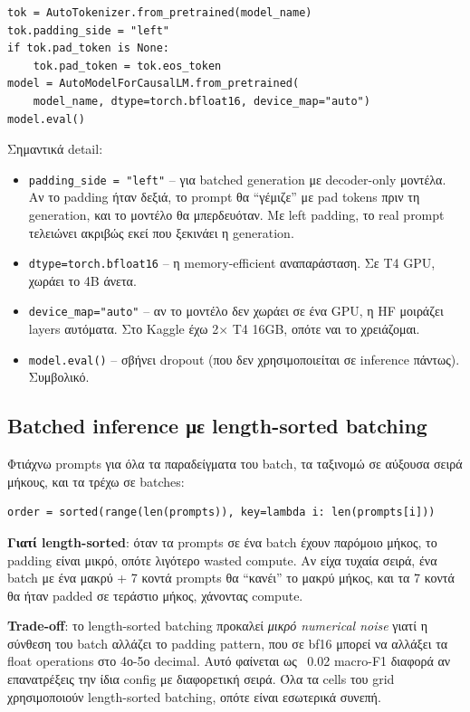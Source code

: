 \documentclass[12pt]{fphw}
\begin{document}
\begin{verbatim}
tok = AutoTokenizer.from_pretrained(model_name)
tok.padding_side = "left"
if tok.pad_token is None:
    tok.pad_token = tok.eos_token
model = AutoModelForCausalLM.from_pretrained(
    model_name, dtype=torch.bfloat16, device_map="auto")
model.eval()
\end{verbatim}

Σημαντικά detail:

\begin{itemize}
    \item \texttt{padding\_side = "left"} -- για batched generation με decoder-only μοντέλα. Αν το padding ήταν δεξιά, το prompt θα ``γέμιζε'' με pad tokens πριν τη generation, και το μοντέλο θα μπερδευόταν. Με left padding, το real prompt τελειώνει ακριβώς εκεί που ξεκινάει η generation.
    \item \texttt{dtype=torch.bfloat16} -- η memory-efficient αναπαράσταση. Σε T4 GPU, χωράει το 4B άνετα.
    \item \texttt{device\_map="auto"} -- αν το μοντέλο δεν χωράει σε ένα GPU, η HF μοιράζει layers αυτόματα. Στο Kaggle έχω 2× T4 16GB, οπότε ναι το χρειάζομαι.
    \item \texttt{model.eval()} -- σβήνει dropout (που δεν χρησιμοποιείται σε inference πάντως). Συμβολικό.
\end{itemize}

\subsection{Batched inference με length-sorted batching}

Φτιάχνω prompts για όλα τα παραδείγματα του batch, τα ταξινομώ σε αύξουσα σειρά μήκους, και τα τρέχω σε batches:

\begin{verbatim}
order = sorted(range(len(prompts)), key=lambda i: len(prompts[i]))
\end{verbatim}

\textbf{Γιατί length-sorted}: όταν τα prompts σε ένα batch έχουν παρόμοιο μήκος, το padding είναι μικρό, οπότε λιγότερο wasted compute. Αν είχα τυχαία σειρά, ένα batch με ένα μακρύ + 7 κοντά prompts θα ``κανέι'' το μακρύ μήκος, και τα 7 κοντά θα ήταν padded σε τεράστιο μήκος, χάνοντας compute.

\textbf{Trade-off}: το length-sorted batching προκαλεί \emph{μικρό numerical noise} γιατί η σύνθεση του batch αλλάζει το padding pattern, που σε bf16 μπορεί να αλλάξει τα float operations στο 4ο-5ο decimal. Αυτό φαίνεται ως ~0.02 macro-F1 διαφορά αν επανατρέξεις την ίδια config με διαφορετική σειρά. Όλα τα cells του grid χρησιμοποιούν length-sorted batching, οπότε είναι εσωτερικά συνεπή.
\end{document}
